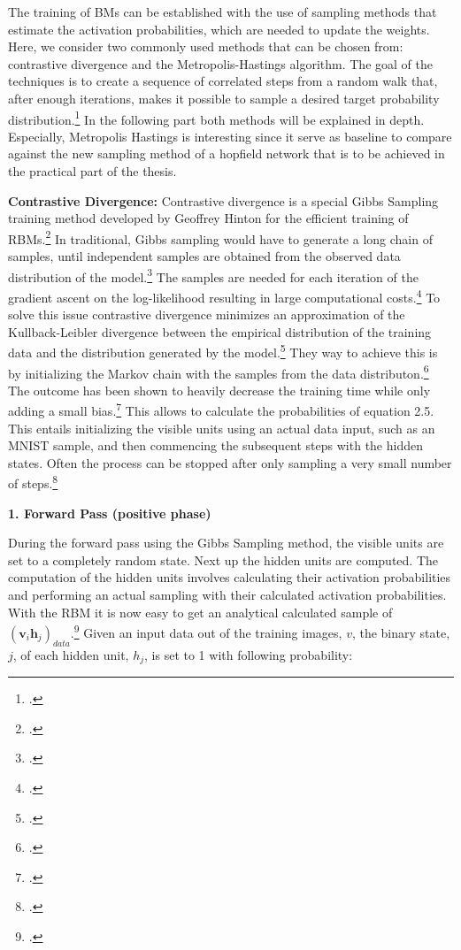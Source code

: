 The training of \ac{BM}s can be established with the use of sampling methods that estimate the activation probabilities, which are needed to update the weights.
Here, we consider two commonly used methods that can be chosen from: contrastive divergence and the Metropolis-Hastings algorithm. 
The goal of the techniques is to create a sequence of correlated steps from a random walk that, after enough iterations, makes it possible to sample a desired target probability distribution.\footcite[cf.][1]{patronOptimalRelaxationRate2024}
In the following part both methods will be explained in depth.
Especially, Metropolis Hastings is interesting since it serve as baseline to compare against the new sampling method of a hopfield network that is to be achieved in the practical part of the thesis.

\textbf{Contrastive Divergence:} Contrastive divergence is a special Gibbs Sampling training method
developed by Geoffrey Hinton for the efficient training of \ac{RBM}s.\footcite[cf.][4-5]{hintonPracticalGuideTraining2012}
In traditional, Gibbs sampling would have to generate a long chain of samples, until
independent samples are obtained from the observed data distribution of the model.\footcite[cf.][5-6]{huembeliPhysicsEnergybasedModels2022}
The samples are needed for each iteration of the gradient ascent on the log-likelihood
resulting in large computational costs.\footcite[cf.][7-8]{upadhyaOverviewRestrictedBoltzmann2019}
To solve this issue contrastive divergence minimizes an approximation of the Kullback-Leibler divergence between the empirical distribution of the training data and the distribution generated by the model.\footcite[cf.][246]{mocanuTopologicalInsightRestricted2016}
They way to achieve this is by initializing the Markov chain with the samples from the data distributon.\footcite[cf.][7-8]{upadhyaOverviewRestrictedBoltzmann2019}
The outcome has been shown to heavily decrease the training time while only adding a small bias.\footcite[cf.][537]{larochelleClassificationUsingDiscriminative2008}
This allows to calculate the probabilities of equation 2.5. 
This entails initializing the visible units using an actual data input, such as an MNIST sample, and then commencing the subsequent steps with the hidden states.
Often the process can be stopped after only sampling a very small number of steps.\footcite[cf.][646]{larochelleLearningAlgorithmsClassification2012}


\textbf{1. Forward Pass (positive phase)}

During the forward pass using the Gibbs Sampling method, the visible units are set to a completely random state. Next up the hidden units are computed.
The computation of the hidden units involves calculating their activation probabilities and performing an actual sampling with their calculated activation probabilities.
With the \ac{RBM} it is now easy to get an analytical calculated sample of $(\textbf{v}_i\textbf{h}_j)_{data}$.\footcite[cf.][5]{hintonPracticalGuideTraining2012}
Given an input data out of the training images, \( v \), the binary state, \( j \), of each hidden unit,  \( h_j \), is set to 1 with following probability:

